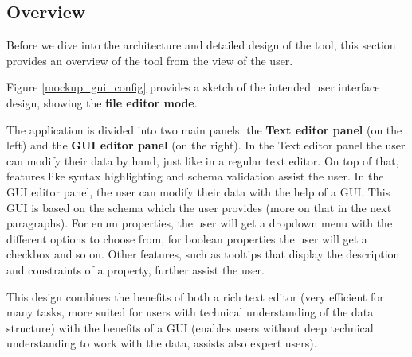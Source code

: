 
\subsection{Overview}\label{subsec:overview} %
Before we dive into the architecture and detailed design of the tool, this section provides an overview of the tool from the view of the user.

Figure \ref{mockup_gui_config} provides a sketch of the intended user interface design, showing the \textbf{file editor mode}. 

The application is divided into two main panels: the  \textbf{Text editor panel} (on the left) and the \textbf{GUI editor panel} (on the right).
In the Text editor panel the user can modify their data by hand, just like in a regular text editor. 
On top of that, features like syntax highlighting and schema validation assist the user.
In the GUI editor panel, the user can modify their data with the help of a GUI. 
This GUI is based on the schema which the user provides (more on that in the next paragraphs). 
For enum properties, the user will get a dropdown menu with the different options to choose from, for boolean properties the user will get a checkbox and so on. 
Other features, such as tooltips that display the description and constraints of a property, further assist the user.

This design combines the benefits of both a rich text editor (very efficient for many tasks, more suited for users with technical understanding of the data structure) with the benefits of a GUI (enables users without deep technical understanding to work with the data, assists also expert users).


